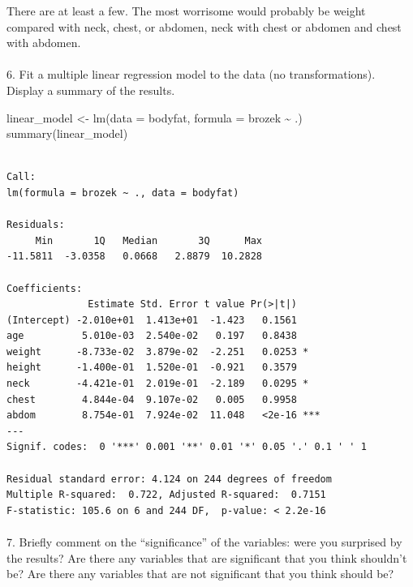 \documentclass[
  letterpaper,
  DIV=11,
  numbers=noendperiod]{scrartcl}
\makeatletter
\let\oldparagraph\paragraph
\renewcommand{\paragraph}{
    \@ifstar
      \xxxParagraphStar
      \xxxParagraphNoStar
  }
\newcommand{\xxxParagraphStar}[1]{\oldparagraph*{#1}\mbox{}}
\newcommand{\xxxParagraphNoStar}[1]{\oldparagraph{#1}\mbox{}}
\newenvironment{Shaded}{\begin{snugshade}}{\end{snugshade}}
\newcommand{\AttributeTok}[1]{\textcolor[rgb]{0.40,0.45,0.13}{#1}}
\newcommand{\FunctionTok}[1]{\textcolor[rgb]{0.28,0.35,0.67}{#1}}
\newcommand{\NormalTok}[1]{\textcolor[rgb]{0.00,0.23,0.31}{#1}}
\newcommand{\OtherTok}[1]{\textcolor[rgb]{0.00,0.23,0.31}{#1}}
\newcommand{\SpecialCharTok}[1]{\textcolor[rgb]{0.37,0.37,0.37}{#1}}
\makeatother
\begin{document}
There are at least a few. The most worrisome would probably be weight
compared with neck, chest, or abdomen, neck with chest or abdomen and
chest with abdomen.

\paragraph{6. Fit a multiple linear regression model to the data (no
transformations). Display a summary of the
results.}\label{fit-a-multiple-linear-regression-model-to-the-data-no-transformations.-display-a-summary-of-the-results.}

\begin{Shaded}
\begin{Highlighting}[]
\NormalTok{linear\_model }\OtherTok{\textless{}{-}} \FunctionTok{lm}\NormalTok{(}\AttributeTok{data =}\NormalTok{ bodyfat, }\AttributeTok{formula =}\NormalTok{ brozek }\SpecialCharTok{\textasciitilde{}}\NormalTok{ .)}
\FunctionTok{summary}\NormalTok{(linear\_model)}
\end{Highlighting}
\end{Shaded}

\begin{verbatim}

Call:
lm(formula = brozek ~ ., data = bodyfat)

Residuals:
     Min       1Q   Median       3Q      Max 
-11.5811  -3.0358   0.0668   2.8879  10.2828 

Coefficients:
              Estimate Std. Error t value Pr(>|t|)    
(Intercept) -2.010e+01  1.413e+01  -1.423   0.1561    
age          5.010e-03  2.540e-02   0.197   0.8438    
weight      -8.733e-02  3.879e-02  -2.251   0.0253 *  
height      -1.400e-01  1.520e-01  -0.921   0.3579    
neck        -4.421e-01  2.019e-01  -2.189   0.0295 *  
chest        4.844e-04  9.107e-02   0.005   0.9958    
abdom        8.754e-01  7.924e-02  11.048   <2e-16 ***
---
Signif. codes:  0 '***' 0.001 '**' 0.01 '*' 0.05 '.' 0.1 ' ' 1

Residual standard error: 4.124 on 244 degrees of freedom
Multiple R-squared:  0.722, Adjusted R-squared:  0.7151 
F-statistic: 105.6 on 6 and 244 DF,  p-value: < 2.2e-16
\end{verbatim}

\paragraph{7. Briefly comment on the ``significance'' of the variables:
were you surprised by the results? Are there any variables that are
significant that you think shouldn't be? Are there any variables that
are not significant that you think should
be?}\label{briefly-comment-on-the-significance-of-the-variables-were-you-surprised-by-the-results-are-there-any-variables-that-are-significant-that-you-think-shouldnt-be-are-there-any-variables-that-are-not-significant-that-you-think-should-be}
\end{document}
